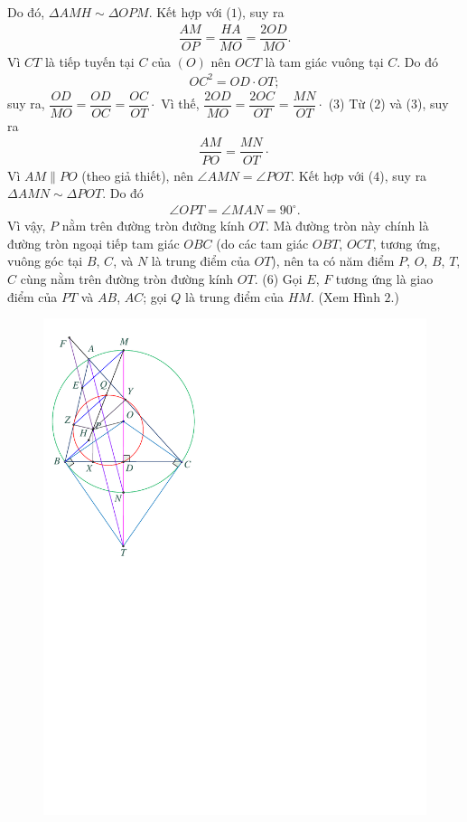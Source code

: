 \begin{multicols}{2}
	Do đó, $\Delta AMH \sim \Delta OPM$. Kết hợp với ($1$), suy ra
	\begin{align*}
		\dfrac{{AM}}{{OP}} = \dfrac{{HA}}{{MO}} = \dfrac{{2OD}}{{MO}}.
	\end{align*}
	Vì $CT$ là tiếp tuyến tại $C$ của $(O)$ nên $OCT$ là tam giác vuông tại $C$. Do đó
	\begin{align*}
		O{C^2} = OD \cdot OT;
	\end{align*}
	suy ra, $\dfrac{{OD}}{{MO}} = \dfrac{{OD}}{{OC}} = \dfrac{{OC}}{{OT}} \cdot$
	\vskip 0.05cm
	Vì thế, $\dfrac{{2OD}}{{MO}} = \dfrac{{2OC}}{{OT}} = \dfrac{{MN}}{{OT}} \cdot$ \hfill ($3$)
	\vskip 0.05cm
	Từ ($2$) và ($3$), suy ra
	\begin{align*}
		\dfrac{{AM}}{{PO}} = \dfrac{{MN}}{{OT}} \cdot \tag{$4$}
	\end{align*}
	Vì $AM \parallel PO$ (theo giả thiết), nên \linebreak$\angle AMN = \angle POT$.  Kết hợp với ($4$), suy ra $\Delta AMN \sim  \Delta POT$. Do đó
	\begin{align*}
		\angle OPT = \angle MAN = 90^\circ. \tag{$5$}
	\end{align*}
	Vì vậy, $P$ nằm trên đường tròn đường kính $OT$. Mà đường tròn này chính là đường tròn ngoại tiếp tam giác $OBC$ (do các tam giác $OBT$, $OCT$, tương ứng, vuông góc tại $B$, $C$, và $N$ là trung điểm của $OT$), nên ta có năm điểm $P$, $O$, $B$, $T$, $C$ cùng nằm trên đường tròn đường kính $OT$. \hfill                                            ($6$)
	\vskip 0.05cm
	Gọi $E$, $F$ tương ứng là giao điểm của $PT$ và $AB$, $AC$; gọi $Q$ là trung điểm của $HM$. (Xem Hình $2$.)
	\begin{figure}[H]
		\centering
		\captionsetup{labelformat= empty, justification=centering}
		\includegraphics[width=0.7\linewidth]{P619H2}

\end{figure}
\end{multicols}
